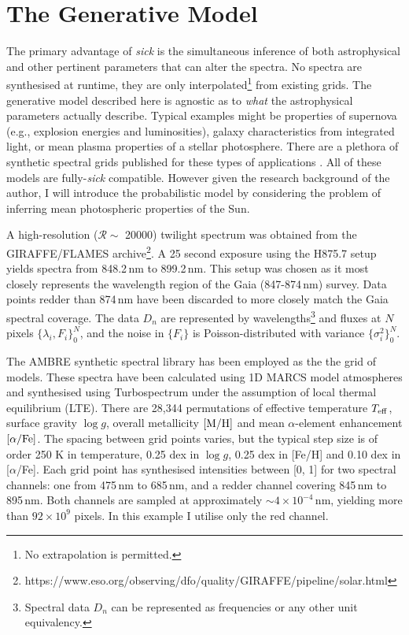 \documentclass{aastex}
\newcommand{\sick}{\textit{sick}}
\begin{document}
\section{The Generative Model}

The primary advantage of \sick{} is the simultaneous inference of both astrophysical and other pertinent parameters that can alter the spectra. No spectra are synthesised at runtime, they are only interpolated\footnote{No extrapolation is permitted.} from existing grids. The generative model described here is agnostic as to \textit{what} the astrophysical parameters actually describe. Typical examples might be properties of supernova (e.g., explosion energies and luminosities), galaxy characteristics from integrated light, or mean plasma properties of a stellar photosphere. There are a plethora of synthetic spectral grids published for these types of applications \citep{who;who;who}. All of these models are fully-\sick{} compatible. However given the research background of the author, I will introduce the probabilistic model by considering the problem of inferring mean photospheric properties of the Sun.

A high-resolution ($\mathcal{R} \sim$ 20000) twilight spectrum was obtained from the GIRAFFE/FLAMES archive\footnote{https://www.eso.org/observing/dfo/quality/GIRAFFE/pipeline/solar.html}. A 25 second exposure using the H875.7 setup yields spectra from 848.2\,nm to 899.2\,nm. This setup was chosen as it most closely represents the wavelength region of the Gaia (847-874\,nm) survey. Data points redder than 874\,nm have been discarded to more closely match the Gaia spectral coverage. The data $D_n$ are represented by wavelengths\footnote{Spectral data $D_n$ can be represented as frequencies or any other unit equivalency.} and fluxes at $N$ pixels $\{\lambda_i,F_i\}_{0}^{N}$, and the noise in $\{F_i\}$ is Poisson-distributed with variance $\{\sigma_{i}^{2}\}_{0}^{N}$. 

The AMBRE synthetic spectral library \citep{ambre} has been employed as the the grid of models. These spectra have been calculated using 1D MARCS model atmospheres and synthesised using Turbospectrum \citep{turbospectrum} under the assumption of local thermal equilibrium (LTE). There are 28,344 permutations of effective temperature $T_{\rm eff}$, surface gravity $\log{g}$, overall metallicity $[{\rm M/H}]$ and mean $\alpha$-element enhancement $[\alpha/{\rm Fe}]$. The spacing between grid points varies, but the typical step size is of order 250 K in temperature, 0.25 dex in $\log{g}$, 0.25 dex in [Fe/H] and 0.10 dex in [$\alpha$/Fe]. Each grid point has synthesised intensities between [0, 1]  for two spectral channels: one from 475\,nm to 685\,nm, and a redder channel covering 845\,nm to 895\,nm. Both channels are sampled at approximately $\sim4\times10^{-4}$\,nm, yielding more than $92\times10^9$ pixels. In this example I utilise only the red channel.
\end{document}
